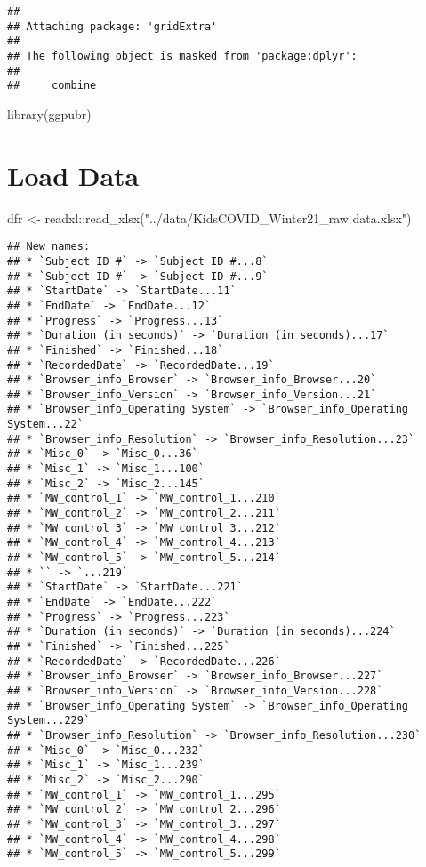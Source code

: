 \documentclass[
]{article}
\newenvironment{Shaded}{\begin{snugshade}}{\end{snugshade}}
\newcommand{\FunctionTok}[1]{\textcolor[rgb]{0.00,0.00,0.00}{#1}}
\newcommand{\NormalTok}[1]{#1}
\newcommand{\OtherTok}[1]{\textcolor[rgb]{0.56,0.35,0.01}{#1}}
\newcommand{\SpecialCharTok}[1]{\textcolor[rgb]{0.00,0.00,0.00}{#1}}
\newcommand{\StringTok}[1]{\textcolor[rgb]{0.31,0.60,0.02}{#1}}
\begin{document}
\begin{verbatim}
## 
## Attaching package: 'gridExtra'
## 
## The following object is masked from 'package:dplyr':
## 
##     combine
\end{verbatim}

\begin{Shaded}
\begin{Highlighting}[]
\FunctionTok{library}\NormalTok{(ggpubr)}
\end{Highlighting}
\end{Shaded}

\hypertarget{load-data}{%
\section{Load Data}\label{load-data}}

\begin{Shaded}
\begin{Highlighting}[]
\NormalTok{dfr }\OtherTok{\textless{}{-}}\NormalTok{ readxl}\SpecialCharTok{::}\FunctionTok{read\_xlsx}\NormalTok{(}\StringTok{"../data/KidsCOVID\_Winter21\_raw data.xlsx"}\NormalTok{)}
\end{Highlighting}
\end{Shaded}

\begin{verbatim}
## New names:
## * `Subject ID #` -> `Subject ID #...8`
## * `Subject ID #` -> `Subject ID #...9`
## * `StartDate` -> `StartDate...11`
## * `EndDate` -> `EndDate...12`
## * `Progress` -> `Progress...13`
## * `Duration (in seconds)` -> `Duration (in seconds)...17`
## * `Finished` -> `Finished...18`
## * `RecordedDate` -> `RecordedDate...19`
## * `Browser_info_Browser` -> `Browser_info_Browser...20`
## * `Browser_info_Version` -> `Browser_info_Version...21`
## * `Browser_info_Operating System` -> `Browser_info_Operating System...22`
## * `Browser_info_Resolution` -> `Browser_info_Resolution...23`
## * `Misc_0` -> `Misc_0...36`
## * `Misc_1` -> `Misc_1...100`
## * `Misc_2` -> `Misc_2...145`
## * `MW_control_1` -> `MW_control_1...210`
## * `MW_control_2` -> `MW_control_2...211`
## * `MW_control_3` -> `MW_control_3...212`
## * `MW_control_4` -> `MW_control_4...213`
## * `MW_control_5` -> `MW_control_5...214`
## * `` -> `...219`
## * `StartDate` -> `StartDate...221`
## * `EndDate` -> `EndDate...222`
## * `Progress` -> `Progress...223`
## * `Duration (in seconds)` -> `Duration (in seconds)...224`
## * `Finished` -> `Finished...225`
## * `RecordedDate` -> `RecordedDate...226`
## * `Browser_info_Browser` -> `Browser_info_Browser...227`
## * `Browser_info_Version` -> `Browser_info_Version...228`
## * `Browser_info_Operating System` -> `Browser_info_Operating System...229`
## * `Browser_info_Resolution` -> `Browser_info_Resolution...230`
## * `Misc_0` -> `Misc_0...232`
## * `Misc_1` -> `Misc_1...239`
## * `Misc_2` -> `Misc_2...290`
## * `MW_control_1` -> `MW_control_1...295`
## * `MW_control_2` -> `MW_control_2...296`
## * `MW_control_3` -> `MW_control_3...297`
## * `MW_control_4` -> `MW_control_4...298`
## * `MW_control_5` -> `MW_control_5...299`
\end{verbatim}
\end{document}
